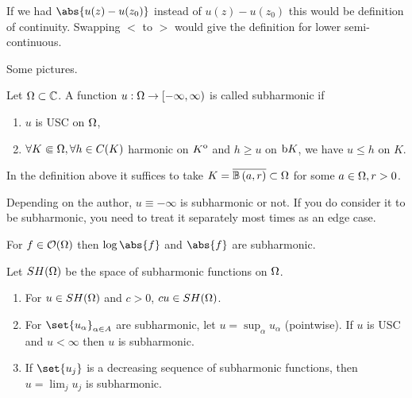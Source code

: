 \begin{note}
    If we had $\abs{u(z) - u(z_0)}$ instead of $u(z) - u(z_0)$ this would be definition of continuity. Swapping $< $ to $>$ would give the definition for lower semi-continuous.
\end{note}

\begin{example}
    Some pictures.
\end{example}

\begin{definition}
    Let $\Omega \subset \mathbb{C}$. A function $u : \Omega \to [-\infty, \infty)$ is called subharmonic if
    \begin{enumerate}
        \item $u$ is USC on $\Omega$,
        \item $\forall K \Subset \Omega, \forall h \in C(K)$ harmonic on ${\kern0ptK}^{\mathrm{o}} $ and $h \geq u$ on $\operatorname{b}\! K$, we have $u \leq h$ on $K$.
    \end{enumerate}
\end{definition}



\begin{note}
    In the definition above it suffices to take $K = \ov{\ball{a}{r}} \subset \om $ for some $a \in \Omega, r > 0$.
\end{note}

\begin{note}
    Depending on the author, $u \equiv - \infty$ is subharmonic or not. If you do consider it to be subharmonic, you need to treat it separately most times as an edge case.
\end{note}

\begin{example}
    For $f \in \mathcal{O}(\Omega)$ then $\log \abs{f}$ and $\abs{f} $ are subharmonic.
\end{example}

\begin{theorem}
    Let $SH(\Omega)$ be the space of subharmonic functions on $\Omega$.
    \begin{enumerate}
        \item For $u \in SH(\Omega)$ and $c>0$, $cu \in SH(\Omega)$.
        \item For $\set{u_\alpha}_{\alpha \in A}$ are subharmonic, let $u = \sup_{\alpha} u_\alpha$ (pointwise). If $u$ is USC and $u < \infty$ then $u$ is subharmonic.
        \item If $\set{u_j}$ is a decreasing sequence of subharmonic functions, then $u = \lim_j u_j$ is subharmonic.
    \end{enumerate}
\end{theorem}

